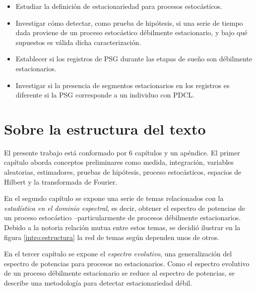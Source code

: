 \begin{itemize}
\item Estudiar la definición de estacionariedad para procesos estocásticos.

\item Investigar cómo detectar, como prueba de hipótesis, si una serie de tiempo dada proviene
de un proceso estocástico débilmente estacionario, y bajo qué supuestos 
es válida dicha caracterización.

\item Establecer si los registros de PSG durante las etapas de sueño son débilmente estacionarios.

\item Investigar si la presencia de segmentos estacionarios en los registros es diferente si la
PSG corresponde a un individuo con PDCL.
\end{itemize}


\section*{Sobre la estructura del texto}


El presente trabajo está conformado por 6 capítulos y un apéndice. El primer capítulo aborda conceptos preliminares como medida, integración, variables aleatorias, estimadores, pruebas de hipótesis, proceso estocásticos, espacios de Hilbert y la transformada de Fourier.


En el segundo capítulo se expone una serie de temas relacionados con la \textit{estadística en el dominio espectral}, es decir, obtener el espectro de potencias de un proceso estocástico --particularmente de procesos débilmente estacionarios.
%
Debido a la notoria relación mutua entre estos temas, se decidió ilustrar en la figura \ref{intro:estructura} la red de temas según dependen unos de otros.

En el tercer capítulo se expone el \textit{espectro evolutivo}, una generalización del espectro de potencias para procesos no estacionarios.
%
Como el espectro evolutivo de un proceso débilmente estacionario se reduce al espectro de potencias, se describe una metodología para detectar estacionariedad débil.

